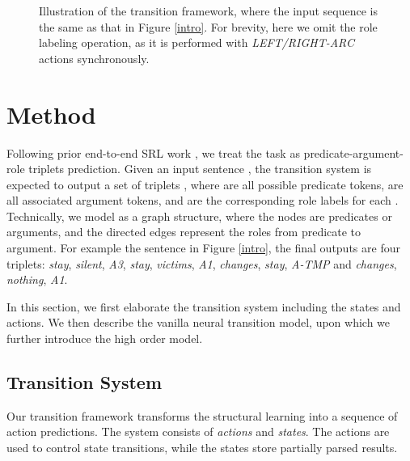 \documentclass[letterpaper]{article} \usepackage{aaai21}  \usepackage{times}  \usepackage{helvet} \usepackage{courier}  \usepackage[hyphens]{url}  \usepackage{graphicx} \urlstyle{rm} \def\UrlFont{\rm}  \usepackage{natbib}  \usepackage{caption}
\begin{document}
\begin{CJK}{UTF8}{gbsn}
\begin{figure*}[!t]
\centering
{}
\caption{
Illustration of the transition framework, where the input sequence is the same as that in Figure \ref{intro}.
For brevity, here we omit the role labeling operation, as it is performed with \emph{LEFT/RIGHT-ARC} actions synchronously.
}
\label{sequence}
\end{figure*}













\section{Method}


Following prior end-to-end SRL work \cite{he-etal-2018-jointly,LiHZZZZZ19}, we treat the task as predicate-argument-role triplets prediction.
Given an input sentence ,
the transition system is expected to output a set of triplets ,
where  are all possible predicate tokens,  are all associated argument tokens,
and  are the corresponding role labels for each .
Technically, we model  as a graph structure, where the nodes are predicates or arguments, and the directed edges represent the roles from predicate to argument.
For example the sentence in Figure \ref{intro}, the final outputs are four triplets: \emph{stay}, \emph{silent}, \emph{A3}, \emph{stay}, \emph{victims}, \emph{A1}, \emph{changes}, \emph{stay}, \emph{A-TMP} and \emph{changes}, \emph{nothing}, \emph{A1}.


In this section, we first elaborate the transition system including the states and actions.
We then describe the vanilla neural transition model, upon which we further introduce the high order model.



\subsection{Transition System}


Our transition framework transforms the structural learning into a sequence of action predictions.
The system consists of \emph{actions} and \emph{states}.
The actions are used to control state transitions, while the states store partially parsed results.



\end{CJK}
\end{document}
